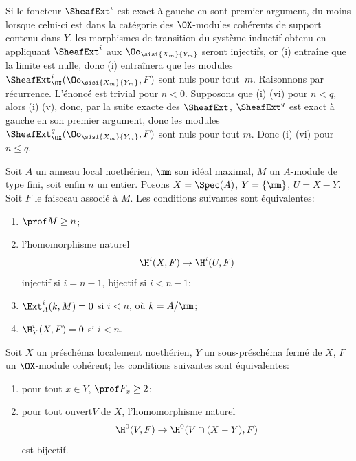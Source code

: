 Si le foncteur $\SheafExt^i$ est exact \`a gauche en sont premier argument, du moins lorsque celui-ci est dans la cat\'egorie des $\OX$-modules coh\'erents de support contenu dans $Y$, les morphismes de transition du syst\`eme inductif obtenu en appliquant $\SheafExt^i$ aux $\Oo_{\sisi{X_m}{Y_m}}$ seront injectifs, or (i) entra\^ine que la limite est nulle, donc (i) entra\^inera que les modules $\SheafExt_{\OX}^i(\Oo_{\sisi{X_m}{Y_m}}, F)$ sont nuls pour tout~$m$. Raisonnons par r\'ecurrence. L'\'enonc\'e est trivial pour $n<0$. Supposons que (i) \ALORS (vi) pour $n<q$, alors (i) \ALORS (v), donc, par la suite exacte des $\SheafExt$, $\SheafExt^q$ est exact \`a gauche en son premier argument, donc les modules $\SheafExt_{\OX}^q(\Oo_{\sisi{X_m}{Y_m}}, F)$ sont nuls pour tout $m$. Donc (i) \ALORS (vi) pour $n\leq q$.
\CQFD

\bgroup
\def\labelenumi{\theenumi)}
\begin{exemple} \label{III.3.4}
Soit $A$ un anneau local noeth\'erien, $\mm$ son id\'eal maximal, $M$ un $A$-module de type fini, soit enfin $n$ un entier. Posons $X=\Spec (A)$, $Y=\{\mm\}$, $U=X-Y$. Soit $F$ le faisceau associ\'e \`a $M$. Les conditions suivantes sont \'equivalentes:
\begin{enumerate}

\item
$\prof M \geq n$;

\item
l'homomorphisme naturel
\[
\H^i(X, F) \to \H^i(U, F)
\]
 injectif si $i=n-1$,  bijectif si $i<n-1$;

\item
$\Ext_A^i(k, M) =0$ si $i<n$, o\`u $k=A/\mm$;

\item
$\H_Y^i(X, F)=0$ si $i<n$.
\end{enumerate}
\end{exemple}


\begin{corollaire} \label{III.3.5}
Soit $X$ un pr\'esch\'ema localement noeth\'erien, $Y$ un sous-pr\'esch\'ema ferm\'e de $X$, $F$ un $\OX$-module coh\'erent; les conditions suivantes sont \'equivalentes:
\begin{enumerate}
\item
pour tout $x\in Y$, $\prof F_x \geq 2$;
\item
pour tout ouvert\pageoriginale $V$ de $X$, l'homomorphisme naturel
\[
\H^0(V, F) \to \H^0(V\cap(X-Y), F)
\]
est bijectif.
\end{enumerate}
\end{corollaire}
\egroup

